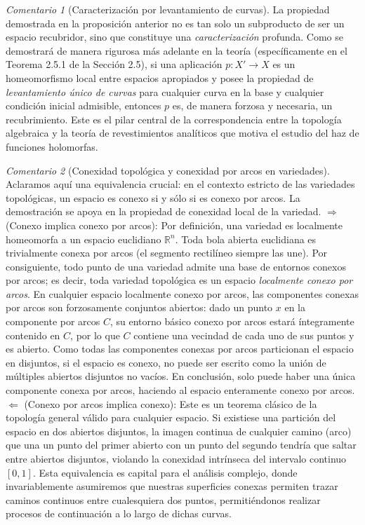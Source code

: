 \documentclass[11pt,a4paper]{article}
\theoremstyle{definition}
\theoremstyle{remark}
\newtheorem{observacion}{Comentario}[section]
\numberwithin{equation}{section}
\begin{document}
\begin{observacion}[Caracterización por levantamiento de curvas]
La propiedad demostrada en la proposición anterior no es tan solo un subproducto de ser un espacio recubridor, sino que constituye una \textit{caracterización} profunda. Como se demostrará de manera rigurosa más adelante en la teoría (específicamente en el Teorema 2.5.1 de la Sección 2.5), si una aplicación $p: X' \to X$ es un homeomorfismo local entre espacios apropiados y posee la propiedad de \textit{levantamiento único de curvas} para cualquier curva en la base y cualquier condición inicial admisible, entonces $p$ es, de manera forzosa y necesaria, un recubrimiento. Este es el pilar central de la correspondencia entre la topología algebraica y la teoría de revestimientos analíticos que motiva el estudio del haz de funciones holomorfas.
\end{observacion}

\begin{observacion}[Conexidad topológica y conexidad por arcos en variedades]
Aclaramos aquí una equivalencia crucial: en el contexto estricto de las variedades topológicas, un espacio es conexo si y sólo si es conexo por arcos. La demostración se apoya en la propiedad de conexidad local de la variedad. 
$\Rightarrow$ (Conexo implica conexo por arcos): Por definición, una variedad es localmente homeomorfa a un espacio euclidiano $\mathbb{R}^n$. Toda bola abierta euclidiana es trivialmente conexa por arcos (el segmento rectilíneo siempre las une). Por consiguiente, todo punto de una variedad admite una base de entornos conexos por arcos; es decir, toda variedad topológica es un espacio \textit{localmente conexo por arcos}. 
En cualquier espacio localmente conexo por arcos, las componentes conexas por arcos son forzosamente conjuntos abiertos: dado un punto $x$ en la componente por arcos $C$, su entorno básico conexo por arcos estará íntegramente contenido en $C$, por lo que $C$ contiene una vecindad de cada uno de sus puntos y es abierto. Como todas las componentes conexas por arcos particionan el espacio en disjuntos, si el espacio es conexo, no puede ser escrito como la unión de múltiples abiertos disjuntos no vacíos. En conclusión, solo puede haber una única componente conexa por arcos, haciendo al espacio enteramente conexo por arcos.
$\Leftarrow$ (Conexo por arcos implica conexo): Este es un teorema clásico de la topología general válido para cualquier espacio. Si existiese una partición del espacio en dos abiertos disjuntos, la imagen continua de cualquier camino (arco) que una un punto del primer abierto con un punto del segundo tendría que saltar entre abiertos disjuntos, violando la conexidad intrínseca del intervalo continuo $[0,1]$.
Esta equivalencia es capital para el análisis complejo, donde invariablemente asumiremos que nuestras superficies conexas permiten trazar caminos continuos entre cualesquiera dos puntos, permitiéndonos realizar procesos de continuación a lo largo de dichas curvas.
\end{observacion}
\end{document}
